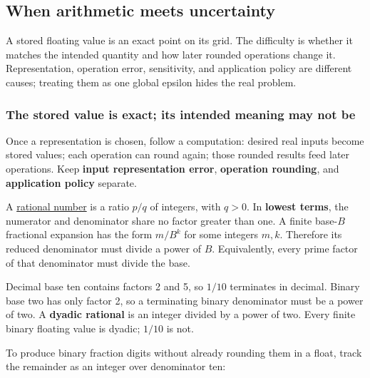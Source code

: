 \subsection{When arithmetic meets uncertainty}\label{05-engine-i-ch001-when-arithmetic-meets-uncertainty}

A stored floating value is an exact point on its grid. The difficulty is whether it matches the intended quantity and how later rounded operations change it. Representation, operation error, sensitivity, and application policy are different causes; treating them as one global epsilon hides the real problem.

\subsubsection{The stored value is exact; its intended meaning may not be}\label{05-engine-i-ch001-the-stored-value-is-exact-its-intended-meaning-may-not-be}

Once a representation is chosen, follow a computation: desired real inputs become stored values; each operation can round again; those rounded results feed later operations. Keep \textbf{input representation error}, \textbf{operation rounding}, and \textbf{application policy} separate.

A \hyperref[appendix-2a2f1b74bdd3]{rational number} is a ratio \(p/q\) of integers, with \(q>0\). In \textbf{lowest terms}, the numerator and denominator share no factor greater than one. A finite base-\(B\) fractional expansion has the form \(m/B^k\) for some integers \(m,k\). Therefore its reduced denominator must divide a power of \(B\). Equivalently, every prime factor of that denominator must divide the base.

Decimal base ten contains factors 2 and 5, so \(1/10\) terminates in decimal. Binary base two has only factor 2, so a terminating binary denominator must be a power of two. A \textbf{dyadic rational} is an integer divided by a power of two. Every finite binary floating value is dyadic; \(1/10\) is not.

To produce binary fraction digits without already rounding them in a float, track the remainder as an integer over denominator ten:

